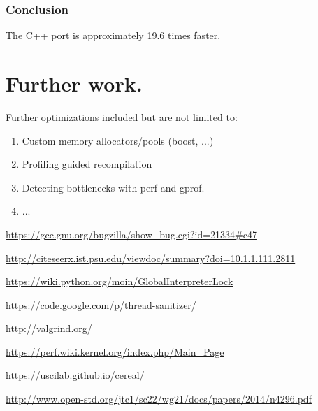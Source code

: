 \documentclass[8pt,a4paper]{report}
\begin{document}
\subsubsection{Conclusion}
The C++ port is approximately 19.6 times faster.

\section{Further work.}
Further optimizations included but are not limited to: 
\begin{enumerate}
\item Custom memory allocators/pools (boost, ...)
\item Profiling guided recompilation
\item Detecting bottlenecks with perf and gprof.
\item ...
\end{enumerate}

\begin{thebibliography}{1}


   \url{https://gcc.gnu.org/bugzilla/show_bug.cgi?id=21334#c47}

   \url{http://citeseerx.ist.psu.edu/viewdoc/summary?doi=10.1.1.111.2811}
  
   \url{https://wiki.python.org/moin/GlobalInterpreterLock}
  
   \url{https://code.google.com/p/thread-sanitizer/}
  
   \url{http://valgrind.org/}
  
   \url{https://perf.wiki.kernel.org/index.php/Main_Page}
  
   \url{https://uscilab.github.io/cereal/}
  
   \url{http://www.open-std.org/jtc1/sc22/wg21/docs/papers/2014/n4296.pdf}

  \end{thebibliography}
\end{document}
